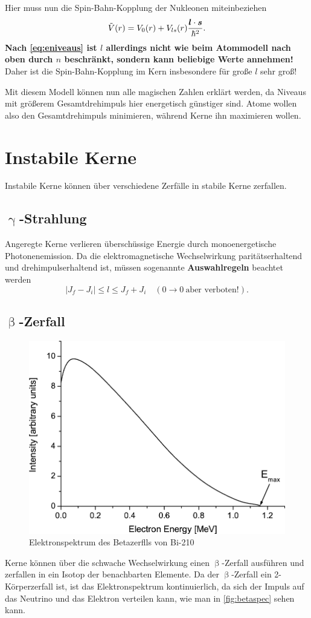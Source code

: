 Hier muss nun die Spin-Bahn-Kopplung der Nukleonen miteinbeziehen
\begin{equation*}
	\tilde{V}(r) = V_0(r) + V_{ls}(r)\frac{\boldsymbol{l}\cdot\boldsymbol{s}}{\hbar^2}.
\end{equation*}
\textbf{Nach \autoref{eq:eniveaus} ist $l$ allerdings nicht wie beim Atommodell nach oben durch $n$ beschränkt, sondern kann beliebige Werte annehmen!}
Daher ist die Spin-Bahn-Kopplung im Kern insbesondere für große $l$ sehr groß!

Mit diesem Modell können nun alle magischen Zahlen erklärt werden, da Niveaus mit größerem Gesamtdrehimpuls hier energetisch günstiger sind.
Atome wollen also den Gesamtdrehimpuls minimieren, während Kerne ihn maximieren wollen.

\section{Instabile Kerne}
Instabile Kerne können über verschiedene Zerfälle in stabile Kerne zerfallen.

\subsection{$\upgamma$-Strahlung}
Angeregte Kerne verlieren überschüssige Energie durch monoenergetische Photonenemission.
Da die elektromagnetische Wechselwirkung paritätserhaltend und drehimpulserhaltend ist, müssen sogenannte \textbf{Auswahlregeln} beachtet werden
\begin{equation*}
	|J_f-J_i|\leq l\leq J_f+ J_i\quad (0\rightarrow 0\ \text{aber verboten!}).
\end{equation*}

\subsection{$\upbeta$-Zerfall}
\begin{figure}
	\centering
	\includegraphics[width=.5\textwidth]{./img/betaspec.jpg}
	\caption{Elektronspektrum des Betazerflls von Bi-210}
	\label{fig:betaspec}
\end{figure}
Kerne können über die schwache Wechselwirkung einen $\upbeta$-Zerfall ausführen und zerfallen in ein Isotop der benachbarten Elemente.
Da der $\upbeta$-Zerfall ein 2-Körperzerfall ist, ist das Elektronspektrum kontinuierlich, da sich der Impuls auf das Neutrino und das Elektron verteilen kann, wie man in \autoref{fig:betaspec} sehen kann.

